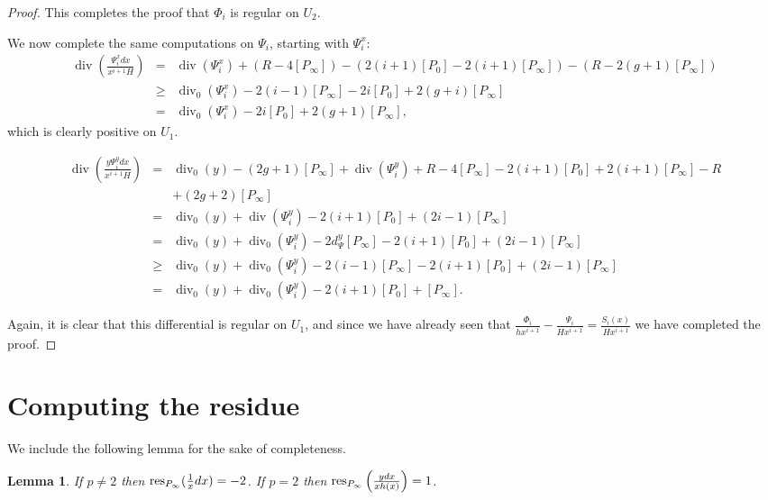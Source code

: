 \documentclass[draft, 11pt]{article} %
\theoremstyle{plain}
\newtheorem{lem}[defn]{Lemma}
\theoremstyle{remark}
\DeclareMathOperator{\di}{div}
\begin{document}
{\begin{proof}
This completes the proof that $\Phi_i$ is regular on $U_2$.

We now complete the same computations on $\Psi_i$, starting with $\Psi_i^x$:
\begin{eqnarray*}
\di\left( \frac{\Psi_i^x dx}{x^{i+1}H} \right) & = & \di(\Psi_i^x) + (R - 4[P_\infty]) - (2(i+1)[P_0] - 2(i+1)[P_\infty]) - (R - 2(g+1)[P_\infty]) \\
& \geq & \di_0(\Psi_i^x ) - 2(i-1)[P_\infty] - 2i[P_0] + 2(g+i)[P_\infty] \\
& = & \di_0(\Psi_i^x) - 2i[P_0] + 2(g+1)[P_\infty],
\end{eqnarray*}
which is clearly positive on $U_1$.

\begin{eqnarray*}
\di\left(\frac{y\Psi_i^y dx}{x^{i+1}H} \right) & = & \di_0(y) - (2g+1)[P_\infty] + \di(\Psi_i^y) + R - 4[P_\infty] -2(i+1)[P_0] + 2(i+1)[P_\infty] - R \\
& & + (2g+2)[P_\infty] \\
& = & \di_0(y) + \di(\Psi_i^y) -2(i+1)[P_0] + (2i -1)[P_\infty] \\
& = & \di_0(y) + \di_0(\Psi_i^y) - 2d_\Psi^y[P_\infty] - 2(i+1)[P_0] + (2i-1)[P_\infty] \\
& \geq & \di_0(y) + \di_0(\Psi_i^y) -2(i-1)[P_\infty] -2(i+1)[P_0] + (2i-1)[P_\infty] \\
& = & \di_0(y) + \di_0(\Psi_i^y) -2(i+1)[P_0] + [P_\infty].
\end{eqnarray*}



Again, it is clear that this differential is regular on $U_1$, and since we have already seen that $\frac{\Phi_i}{hx^{i+1}} - \frac{\Psi_i}{Hx^{i+1}} = \frac{S_i(x)}{Hx^{i+1}}$ we have completed the proof.



\end{proof}

\section{Computing the residue}

We include the following lemma for the sake of completeness.

\begin{lem}
If $p \neq 2$ then ${\rm res}_{P_\infty}(\frac{1}{x}dx) = -2$.
If $p=2$ then ${\rm res}_{P_\infty}\left(\frac{ydx}{xh(x)}\right) = 1$.
\end{lem}

}
\end{document}
